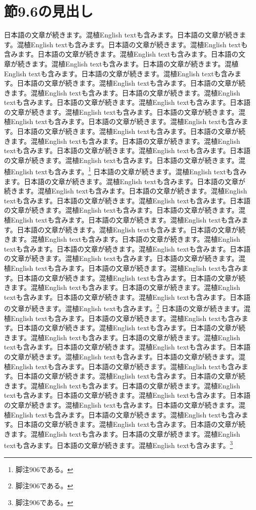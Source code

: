 \documentclass[pdflatex,book]{jlreq}
\begin{document}
\section{節9.6の見出し}
日本語の文章が続きます。混植English textも含みます。日本語の文章が続きます。混植English textも含みます。日本語の文章が続きます。混植English textも含みます。日本語の文章が続きます。混植English textも含みます。日本語の文章が続きます。混植English textも含みます。日本語の文章が続きます。混植English textも含みます。日本語の文章が続きます。混植English textも含みます。日本語の文章が続きます。混植English textも含みます。日本語の文章が続きます。混植English textも含みます。日本語の文章が続きます。混植English textも含みます。日本語の文章が続きます。混植English textも含みます。日本語の文章が続きます。混植English textも含みます。日本語の文章が続きます。混植English textも含みます。日本語の文章が続きます。混植English textも含みます。日本語の文章が続きます。混植English textも含みます。日本語の文章が続きます。混植English textも含みます。日本語の文章が続きます。混植English textも含みます。日本語の文章が続きます。混植English textも含みます。日本語の文章が続きます。混植English textも含みます。日本語の文章が続きます。混植English textも含みます。\footnote{脚注906である。}
日本語の文章が続きます。混植English textも含みます。日本語の文章が続きます。混植English textも含みます。日本語の文章が続きます。混植English textも含みます。日本語の文章が続きます。混植English textも含みます。日本語の文章が続きます。混植English textも含みます。日本語の文章が続きます。混植English textも含みます。日本語の文章が続きます。混植English textも含みます。日本語の文章が続きます。混植English textも含みます。日本語の文章が続きます。混植English textも含みます。日本語の文章が続きます。混植English textも含みます。日本語の文章が続きます。混植English textも含みます。日本語の文章が続きます。混植English textも含みます。日本語の文章が続きます。混植English textも含みます。日本語の文章が続きます。混植English textも含みます。日本語の文章が続きます。混植English textも含みます。日本語の文章が続きます。混植English textも含みます。日本語の文章が続きます。混植English textも含みます。日本語の文章が続きます。混植English textも含みます。日本語の文章が続きます。混植English textも含みます。日本語の文章が続きます。混植English textも含みます。\footnote{脚注906である。}
日本語の文章が続きます。混植English textも含みます。日本語の文章が続きます。混植English textも含みます。日本語の文章が続きます。混植English textも含みます。日本語の文章が続きます。混植English textも含みます。日本語の文章が続きます。混植English textも含みます。日本語の文章が続きます。混植English textも含みます。日本語の文章が続きます。混植English textも含みます。日本語の文章が続きます。混植English textも含みます。日本語の文章が続きます。混植English textも含みます。日本語の文章が続きます。混植English textも含みます。日本語の文章が続きます。混植English textも含みます。日本語の文章が続きます。混植English textも含みます。日本語の文章が続きます。混植English textも含みます。日本語の文章が続きます。混植English textも含みます。日本語の文章が続きます。混植English textも含みます。日本語の文章が続きます。混植English textも含みます。日本語の文章が続きます。混植English textも含みます。日本語の文章が続きます。混植English textも含みます。日本語の文章が続きます。混植English textも含みます。日本語の文章が続きます。混植English textも含みます。\footnote{脚注906である。}
\end{document}
